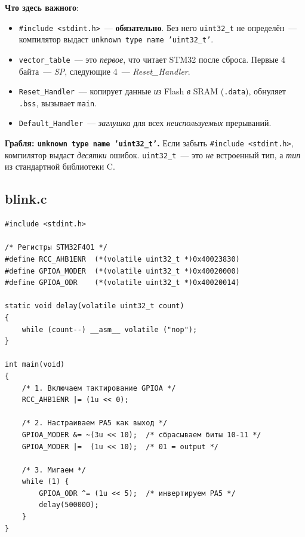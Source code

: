 \textbf{Что здесь важного}:

\begin{itemize}
    \item \texttt{\#include <stdint.h>}~--- \textbf{обязательно}.
          Без него \texttt{uint32\_t} не определён~---
          компилятор выдаст \texttt{unknown type name 'uint32\_t'}.
    \item \texttt{vector\_table}~--- это \emph{первое},
          что читает STM32 после сброса. Первые 4 байта~---
          \emph{SP}, следующие 4~--- \emph{Reset\_Handler}.
    \item \texttt{Reset\_Handler}~--- копирует данные
          \emph{из} Flash \emph{в} SRAM (\texttt{.data}),
          обнуляет \texttt{.bss}, вызывает \texttt{main}.
    \item \texttt{Default\_Handler}~--- \emph{заглушка}
          для всех \emph{неиспользуемых} прерываний.
\end{itemize}

\begin{warnbox}
\textbf{Грабля: \texttt{unknown type name 'uint32\_t'}.}
Если забыть \texttt{\#include <stdint.h>}, компилятор
выдаст \emph{десятки} ошибок. \texttt{uint32\_t}~---
это \emph{не} встроенный тип, а \emph{тип} из
стандартной библиотеки C.
\end{warnbox}

\subsection{blink.c}

\begin{listing}[htbp]
\begin{verbatim}
#include <stdint.h>

/* Регистры STM32F401 */
#define RCC_AHB1ENR  (*(volatile uint32_t *)0x40023830)
#define GPIOA_MODER  (*(volatile uint32_t *)0x40020000)
#define GPIOA_ODR    (*(volatile uint32_t *)0x40020014)

static void delay(volatile uint32_t count)
{
    while (count--) __asm__ volatile ("nop");
}

int main(void)
{
    /* 1. Включаем тактирование GPIOA */
    RCC_AHB1ENR |= (1u << 0);

    /* 2. Настраиваем PA5 как выход */
    GPIOA_MODER &= ~(3u << 10);  /* сбрасываем биты 10-11 */
    GPIOA_MODER |=  (1u << 10);  /* 01 = output */

    /* 3. Мигаем */
    while (1) {
        GPIOA_ODR ^= (1u << 5);  /* инвертируем PA5 */
        delay(500000);
    }
}
\end{verbatim}
\caption{\texttt{blink.c}~--- мигание LED LD2 на Nucleo-F401RE}
\label{lst:flashing-blink}
\end{listing}

